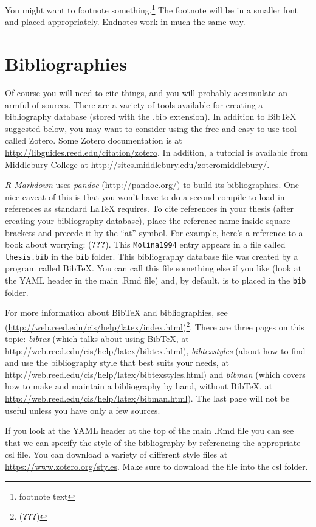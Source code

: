 \documentclass[twoside,12pt,final]{ucthesis-CA2012} %
\begin{document}
\begin{ucmainmatter}
You might want to footnote something.\footnote{footnote text} The
footnote will be in a smaller font and placed appropriately. Endnotes
work in much the same way.

\hypertarget{bibliographies}{%
\section{Bibliographies}\label{bibliographies}}

Of course you will need to cite things, and you will probably accumulate
an armful of sources. There are a variety of tools available for
creating a bibliography database (stored with the .bib extension). In
addition to BibTeX suggested below, you may want to consider using the
free and easy-to-use tool called Zotero. Some Zotero documentation is at
\url{http://libguides.reed.edu/citation/zotero}. In addition, a tutorial
is available from Middlebury College at
\url{http://sites.middlebury.edu/zoteromiddlebury/}.

\emph{R Markdown} uses \emph{pandoc} (\url{http://pandoc.org/}) to build
its bibliographies. One nice caveat of this is that you won't have to do
a second compile to load in references as standard LaTeX requires. To
cite references in your thesis (after creating your bibliography
database), place the reference name inside square brackets and precede
it by the ``at'' symbol. For example, here's a reference to a book about
worrying: ({\textbf{???}}). This \texttt{Molina1994} entry appears in a
file called \texttt{thesis.bib} in the \texttt{bib} folder. This
bibliography database file was created by a program called BibTeX. You
can call this file something else if you like (look at the YAML header
in the main .Rmd file) and, by default, is to placed in the \texttt{bib}
folder.

For more information about BibTeX and bibliographies, see
(\url{http://web.reed.edu/cis/help/latex/index.html})\footnote{({\textbf{???}})}.
There are three pages on this topic: \emph{bibtex} (which talks about
using BibTeX, at \url{http://web.reed.edu/cis/help/latex/bibtex.html}),
\emph{bibtexstyles} (about how to find and use the bibliography style
that best suits your needs, at
\url{http://web.reed.edu/cis/help/latex/bibtexstyles.html}) and
\emph{bibman} (which covers how to make and maintain a bibliography by
hand, without BibTeX, at
\url{http://web.reed.edu/cis/help/latex/bibman.html}). The last page
will not be useful unless you have only a few sources.

If you look at the YAML header at the top of the main .Rmd file you can
see that we can specify the style of the bibliography by referencing the
appropriate csl file. You can download a variety of different style
files at \url{https://www.zotero.org/styles}. Make sure to download the
file into the csl folder.


\end{ucmainmatter}
\end{document}
